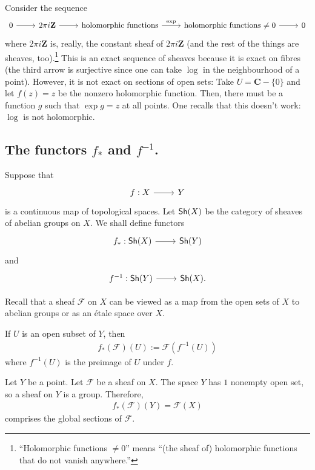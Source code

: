 \documentclass [11 pt, oneside] {article}
\begin{document}
\begin{example}[ ]\label{}\text{}
Consider the sequence
\[
\begin{tikzcd}
	0 \ar[r] & 2\pi i \mathbf{Z} \ar[r] & \textrm{holomorphic functions} \ar[r, "\exp"] &\textrm{holomorphic functions $\ne 0$} \ar[r] & 0
\end{tikzcd}
\]
where $2\pi i \mathbf{Z}$ is, really, the constant sheaf of $2\pi i \mathbf{Z}$ (and the rest of the things are sheaves, too).\footnote{``Holomorphic functions $\ne 0$'' means ``(the sheaf of) holomorphic functions that do not vanish anywhere.''} This is an exact sequence of sheaves because it is exact on fibres (the third arrow is surjective since one can take $\log$ in the neighbourhood of a point). However, it is not exact on sections of open sets: Take $U = \mathbf{C}-\{0\}$ and let $f(z)=z$ be the nonzero holomorphic function. Then, there must be a function $g$ such that $\exp g = z$ at all points. One recalls that this doesn't work: $\log$ is not holomorphic.
\end{example}

\subsection{The functors \texorpdfstring{$f_*$}{f*} and \texorpdfstring{$f^{-1}$}{f-1}.}\label{functorsp_1}
Suppose that
\[
\begin{tikzcd}
f:X\ar[r]&Y
\end{tikzcd}
\]
is a continuous map of topological spaces. Let $\textsf{Sh}(X)$ be the category of sheaves of abelian groups on $X$. We shall define functors 
\[
\begin{tikzcd}
f_* : \catn{Sh}(X) \ar[r]& \catn{Sh}(Y)
\end{tikzcd}
\]
and 
\[
\begin{tikzcd}
f^{-1} : \catn{Sh}(Y) \ar[r]& \catn{Sh}(X).
\end{tikzcd}
\]

Recall that a sheaf $\mathscr{F}$ on $X$ can be viewed as a map from the open sets of $X$ to abelian groups or as an \'etale space over $X$.

If $U$ is an open subset of $Y$, then
\begin{align*}
	f_*(\mathscr{F}) (U) :=  \mathscr{F}(f^{-1}(U))
\end{align*}
where $f^{-1}(U)$ is the preimage of $U$ under $f$.

\begin{example}[ ]\label{}\text{}
Let $Y$ be a point. Let $\mathscr{F}$ be a sheaf on $X$. The space $Y$ has $1$ nonempty open set, so a sheaf on $Y$ is a group. Therefore,
\begin{align*}
	f_*(\mathscr{F}) (Y) =  \mathscr{F}(X)
\end{align*}
comprises the global sections of $\mathscr{F}$.
\end{example}
\end{document}
